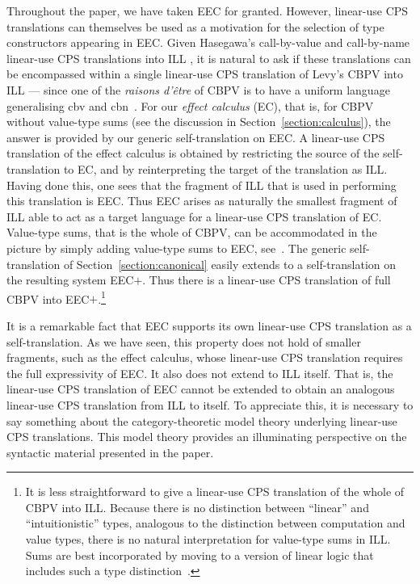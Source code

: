 \documentclass{LMCS}
\begin{document}
Throughout the paper, we have taken EEC for granted. However, linear-use CPS translations
can themselves be used as a motivation for the selection of type constructors 
appearing in EEC. 
Given Hasegawa's call-by-value and call-by-name linear-use CPS translations into ILL
\cite{Hasegawa:Flops:02,Hasegawa:Flops:04}, it is natural to ask if these translations
can be encompassed within a single linear-use CPS translation of Levy's CBPV
into ILL --- since one of the \emph{raisons d'\^{e}tre} of CBPV is to have a uniform 
language generalising cbv and cbn~\cite{Levy:book}. For our \emph{effect calculus} (EC),
that is, for CBPV without value-type sums (see the discussion in 
Section~\ref{section:calculus}), the answer is provided by
our generic self-translation on EEC. A linear-use CPS translation of the effect calculus is obtained by
restricting the source of the self-translation to EC,
and by reinterpreting the target of the translation as ILL.
Having done this, one sees that
the fragment of ILL that is used in performing this translation is EEC.
Thus EEC arises as naturally the smallest fragment of ILL able to act as a target language
for a linear-use CPS translation of EC.
Value-type sums, that is the whole of CBPV, can be accommodated in the picture
by simply adding value-type sums to EEC, see~\cite{EMSb}. The 
generic self-translation of Section~\ref{section:canonical} easily extends
to a self-translation on the resulting system EEC$+$. Thus there is a
linear-use CPS translation of full CBPV into EEC$+$.\footnote{It 
is less straightforward to give a linear-use
CPS translation of the whole of CBPV into ILL. Because there is
no distinction between ``linear'' and ``intuitionistic'' types, analogous
to the distinction between computation and value types, there is no
natural interpretation for  value-type sums in ILL. Sums are best incorporated by
moving to a version of linear logic that includes such a type distinction~\cite{Benton:95}.}

It is a remarkable fact that EEC supports its own linear-use CPS translation as
a self-translation. As we have seen, this property does not hold of smaller 
fragments, such as the effect calculus, whose linear-use CPS translation
requires the full expressivity of EEC.  It also does not extend to ILL
itself. That is, the linear-use CPS translation of EEC cannot be extended to
obtain an analogous linear-use CPS translation from ILL to itself.
To appreciate this, it is necessary to say something about the
category-theoretic model theory underlying linear-use CPS translations.
This model theory provides an illuminating perspective on the 
syntactic material presented in the paper.
\end{document}
